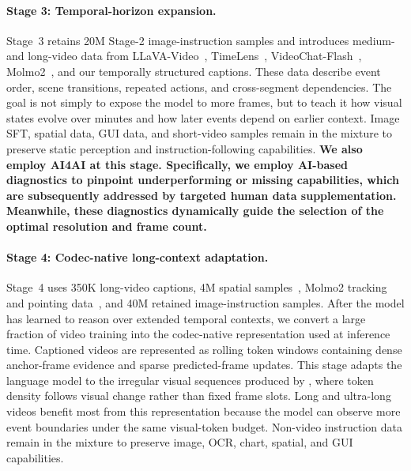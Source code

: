 \paragraph{Stage 3: Temporal-horizon expansion.}
Stage~3 retains 20M Stage-2 image-instruction samples and introduces medium- and long-video data from LLaVA-Video~\citep{zhang2025llavavideovideoinstructiontuning}, TimeLens~\citep{zhang2026timelensrethinkingvideotemporal}, VideoChat-Flash~\citep{videochatflash2025}, Molmo2~\citep{clark2026molmo2}, and our temporally structured captions. These data describe event order, scene transitions, repeated actions, and cross-segment dependencies. The goal is not simply to expose the model to more frames, but to teach it how visual states evolve over minutes and how later events depend on earlier context. Image SFT, spatial data, GUI data, and short-video samples remain in the mixture to preserve static perception and instruction-following capabilities. \textbf{We also employ AI4AI at this stage. Specifically, we employ AI-based diagnostics to pinpoint underperforming or missing capabilities, which are subsequently addressed by targeted human data supplementation. Meanwhile, these diagnostics dynamically guide the selection of the optimal resolution and frame count.}



\paragraph{Stage 4: Codec-native long-context adaptation.}
Stage~4 uses 350K long-video captions, 4M spatial samples~\citep{llavaonevision2}, Molmo2 tracking and pointing data~\citep{clark2026molmo2}, and 40M retained image-instruction samples. After the model has learned to reason over extended temporal contexts, we convert a large fraction of video training into the codec-native representation used at inference time. Captioned videos are represented as rolling token windows containing dense anchor-frame evidence and sparse predicted-frame updates. This stage adapts the language model to the irregular visual sequences produced by \magevit, where token density follows visual change rather than fixed frame slots. Long and ultra-long videos benefit most from this representation because the model can observe more event boundaries under the same visual-token budget. Non-video instruction data remain in the mixture to preserve image, OCR, chart, spatial, and GUI capabilities.


